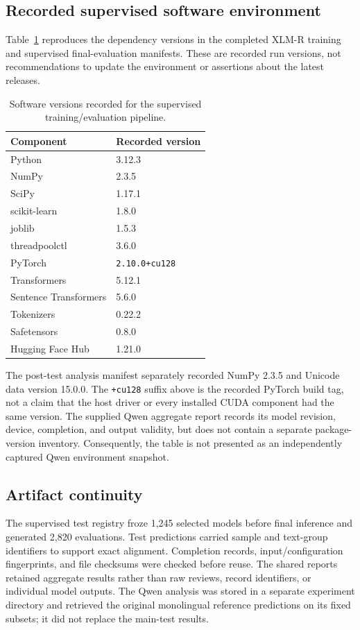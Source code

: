 \subsection{Recorded supervised software environment}
Table~\ref{tab:recorded_supervised_environment} reproduces the dependency versions in the completed XLM-R training and supervised final-evaluation manifests. These are recorded run versions, not recommendations to update the environment or assertions about the latest releases.

\begin{table}[htbp]
\centering
\small
\caption{Software versions recorded for the supervised training/evaluation pipeline.}
\label{tab:recorded_supervised_environment}
\begin{tabular}{ll}
\hline
Component & Recorded version \\
\hline
Python & 3.12.3 \\
NumPy & 2.3.5 \\
SciPy & 1.17.1 \\
scikit-learn & 1.8.0 \\
joblib & 1.5.3 \\
threadpoolctl & 3.6.0 \\
PyTorch & \texttt{2.10.0+cu128} \\
Transformers & 5.12.1 \\
Sentence Transformers & 5.6.0 \\
Tokenizers & 0.22.2 \\
Safetensors & 0.8.0 \\
Hugging Face Hub & 1.21.0 \\
\hline
\end{tabular}
\end{table}

The post-test analysis manifest separately recorded NumPy 2.3.5 and Unicode data version 15.0.0. The \texttt{+cu128} suffix above is the recorded PyTorch build tag, not a claim that the host driver or every installed CUDA component had the same version. The supplied Qwen aggregate report records its model revision, device, completion, and output validity, but does not contain a separate package-version inventory. Consequently, the table is not presented as an independently captured Qwen environment snapshot.

\subsection{Artifact continuity}
The supervised test registry froze 1,245 selected models before final inference and generated 2,820 evaluations. Test predictions carried sample and text-group identifiers to support exact alignment. Completion records, input/configuration fingerprints, and file checksums were checked before reuse. The shared reports retained aggregate results rather than raw reviews, record identifiers, or individual model outputs. The Qwen analysis was stored in a separate experiment directory and retrieved the original monolingual reference predictions on its fixed subsets; it did not replace the main-test results.

